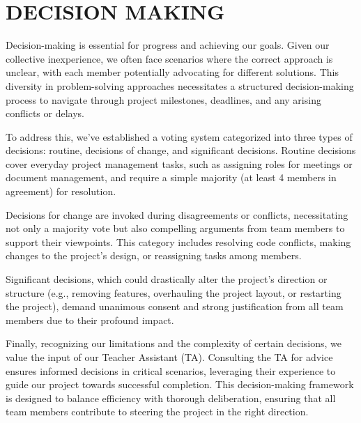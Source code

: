 \section{DECISION MAKING}
Decision-making is essential for progress and achieving our goals. Given our collective inexperience, we often face scenarios where the correct approach is unclear, with each member potentially advocating for different solutions. This diversity in problem-solving approaches necessitates a structured decision-making process to navigate through project milestones, deadlines, and any arising conflicts or delays. \par
\smallskip
To address this, we've established a voting system categorized into three types of decisions: routine, decisions of change, and significant decisions. Routine decisions cover everyday project management tasks, such as assigning roles for meetings or document management, and require a simple majority (at least 4 members in agreement) for resolution.\par
\smallskip
Decisions for change are invoked during disagreements or conflicts, necessitating not only a majority vote but also compelling arguments from team members to support their viewpoints. This category includes resolving code conflicts, making changes to the project's design, or reassigning tasks among members. \par
\smallskip
Significant decisions, which could drastically alter the project's direction or structure (e.g., removing features, overhauling the project layout, or restarting the project), demand unanimous consent and strong justification from all team members due to their profound impact.\par
\smallskip
Finally, recognizing our limitations and the complexity of certain decisions, we value the input of our Teacher Assistant (TA). Consulting the TA for advice ensures informed decisions in critical scenarios, leveraging their experience to guide our project towards successful completion. This decision-making framework is designed to balance efficiency with thorough deliberation, ensuring that all team members contribute to steering the project in the right direction.\par
\smallskip